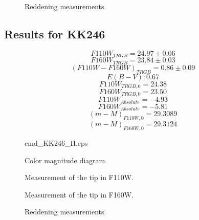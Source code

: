 \documentclass[12,manuscript,usenatbib]{aastex}
\begin{document}
\begin{figure}
\caption{Reddening measurements.\label{reddening1}}
\end{figure}

\subsection{Results for KK246}

\begin{equation}
F110W_{TRGB}=24.97 \pm 0.06
\end{equation}
\begin{equation}
F160W_{TRGB}=23.84 \pm 0.03
\end{equation}
\begin{equation}
(F110W-F160W)_{TRGB}=0.86 \pm 0.09
\end{equation}
\begin{equation}
E(B-V): 0.67
\end{equation}
\begin{equation}
F110W_{TRGB,0} = 24.38
\end{equation}
\begin{equation}
F160W_{TRGB,0} = 23.50
\end{equation}
\begin{equation}
F110W_{Absolute} = -4.93
\end{equation}
\begin{equation}
F160W_{Absolute} = -5.81
\end{equation}
\begin{equation}
(m-M)_{F110W,0}=29.3089
\end{equation}
\begin{equation}
(m-M)_{F160W,0}=29.3124
\end{equation}

\begin{figure}
 {cmd_KK246_H.eps}
\caption{Color magnitude diagram.\label{cmd2}}
\end{figure}

\begin{figure}
\caption{Measurement of the tip in F110W.\label{lf2_1}}
\end{figure}

\begin{figure}
\caption{Measurement of the tip in F160W.\label{lf2_2}}
\end{figure}


\begin{figure}
\caption{Reddening measurements.\label{reddening2}}
\end{figure}





\end{document}
